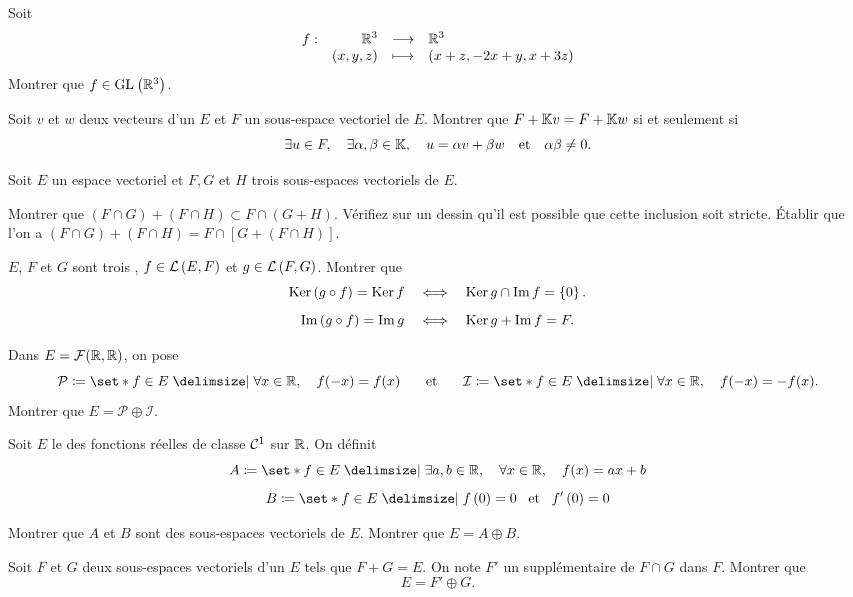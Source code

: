 \documentclass{magnolia}
\begin{document}
Soit
\[\begin{array}[t]{lrcl} \displaystyle{f} : & \displaystyle{\mathbb{R}^3} & \longrightarrow & \displaystyle{\mathbb{R}^3} \\ & \displaystyle{(x,y,z)} & \longmapsto & \displaystyle{(x+z,-2x+y,x+3z)} \end{array}\]
Montrer que $f\in{\rm GL}_{}\left(\mathbb{R}^3\right)$.



Soit $v$ et $w$ deux vecteurs d'un \Kev $E$ et $F$ un sous-espace vectoriel de $E$.
Montrer que $F+\mathbb{K} v=F+\mathbb{K} w$ si et seulement si
\[\exists u \in F ,\quad \exists \alpha,\beta \in \mathbb{K} ,\quad u=\alpha v+\beta
  w \quad \text{et} \quad \alpha\beta\not=0.\]

Soit $E$ un espace vectoriel et $F,G$ et $H$ trois sous-espaces vectoriels de $E$.
\begin{questions}
\question  Montrer que $(F\cap G)+(F\cap H)\subset F\cap (G+H)$.
  Vérifiez sur un dessin qu'il est possible que cette inclusion soit stricte.
\question Établir que l'on a $(F\cap G)+(F\cap H)=F\cap [G+(F\cap H)]$.
\end{questions}

$E$, $F$   et  $G$  sont  trois \Kevs, $f\in\mathcal{L}\left(E,F\right)$  et  $g\in\mathcal{L}\left(F,G\right)$.
Montrer que
\[\mathop{\rm Ker}\left(g \circ f\right) = \mathop{\rm Ker} f \quad\Longleftrightarrow\quad
  \mathop{\rm Ker} g \cap \operatorname{Im} f  = \left\{0\right\}.\]
\[\operatorname{Im}\left(g \circ f\right) = \operatorname{Im} g \quad\Longleftrightarrow\quad
  \mathop{\rm Ker} g+\operatorname{Im} f = F.\]


Dans $E=\mathcal{F}(\mathbb{R},\mathbb{R})$, on pose
\[\mathcal{P}\defeq\enstq{f\in E}{\forall x\in\R\qsep f(-x)=f(x)} \quad\et\quad
  \mathcal{I}\defeq\enstq{f\in E}{\forall x\in\R\qsep f(-x)=-f(x)}.\]
Montrer que $E=\mathcal{P}\oplus\mathcal{I}$.

Soit $E$ le \Rev des fonctions réelles de classe $\mathcal{C}^{1}$ sur $\mathbb{R}$. On
définit
\[A\defeq\enstq{f\in E}{\exists a,b\in\R \qsep \forall x\in\R \qsep f(x)=ax+b}\]
\[B\defeq\enstq{f\in E}{f\p{0}=0 \et f'\p{0}=0}\]
\begin{questions}
\question Montrer que $A$ et $B$ sont des sous-espaces vectoriels de $E$.
\question Montrer que $E=A\oplus B$.
\end{questions}


Soit $F$ et $G$ deux sous-espaces vectoriels d'un \Kev $E$ tels que $F+G=E$. On
note $F'$ un supplémentaire de $F\cap G$ dans $F$. Montrer que
\[E=F'\oplus G.\]

\end{document}

